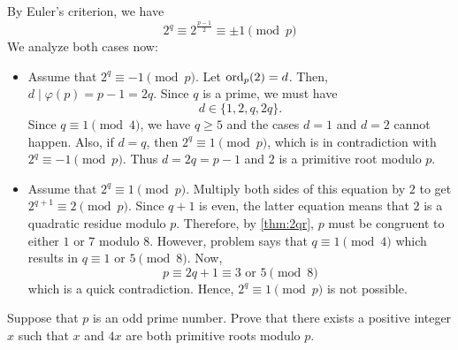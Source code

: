 \documentclass{subfile}
\begin{document}
	\begin{solution}
		By Euler's criterion, we have
		\[2^q \equiv 2^{\frac{p-1}{2}} \equiv \pm 1 \pmod{p}\]
		 We analyze both cases now:
			\begin{itemize}
				\item Assume that $2^q \equiv -1 \pmod p$. Let $\operatorname{ord}_p(2)=d$. Then, $d\mid \varphi(p)=p-1=2q$. Since $q$ is a prime, we must have $$d \in \{1,2,q,2q\}.$$ Since $q \equiv 1 \pmod 4$, we have $q \geq 5$ and the cases $d=1$ and $d=2$ cannot happen. Also, if $d=q$, then $2^q \equiv 1 \pmod p$, which is in contradiction with $2^q \equiv -1 \pmod p$. Thus $d=2q=p-1$ and $2$ is a primitive root modulo $p$.
				\item Assume that $2^q \equiv 1 \pmod{p}$. Multiply both sides of this equation by $2$ to get $2^{q+1} \equiv 2 \pmod p$. Since $q+1$ is even, the latter equation means that $2$ is a quadratic residue modulo $p$. Therefore, by \autoref{thm:2qr}, $p$ must be congruent to either $1$ or $7$ modulo $8$. However, problem says that $q \equiv 1 \pmod 4$ which results in $q \equiv 1$ or $5 \pmod 8$. Now,
				\[p \equiv 2q +1 \equiv 3 \text{ or } 5 \pmod 8\]
				which is a quick contradiction. Hence, $2^q \equiv 1 \pmod{p}$ is not possible.
			\end{itemize}

	\end{solution}

	\begin{problem}
		Suppose that $p$ is an odd prime number. Prove that there exists a positive integer $x$ such that $x$ and $4x$ are both primitive roots modulo $p$.
	\end{problem}
\end{document}
